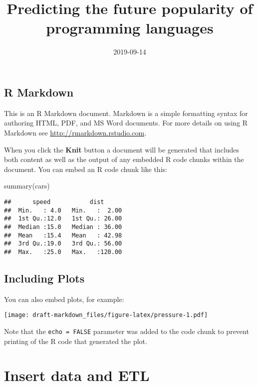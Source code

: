 \documentclass[
]{article}
\title{Predicting the future popularity of programming languages}
\author{}
\date{\vspace{-2.5em}2019-09-14}
\newenvironment{Shaded}{\begin{snugshade}}{\end{snugshade}}
\newcommand{\FunctionTok}[1]{\textcolor[rgb]{0.00,0.00,0.00}{#1}}
\newcommand{\NormalTok}[1]{#1}
\begin{document}
\maketitle

\hypertarget{r-markdown}{%
\subsection{R Markdown}\label{r-markdown}}

This is an R Markdown document. Markdown is a simple formatting syntax
for authoring HTML, PDF, and MS Word documents. For more details on
using R Markdown see \url{http://rmarkdown.rstudio.com}.

When you click the \textbf{Knit} button a document will be generated
that includes both content as well as the output of any embedded R code
chunks within the document. You can embed an R code chunk like this:

\begin{Shaded}
\begin{Highlighting}[]
\FunctionTok{summary}\NormalTok{(cars)}
\end{Highlighting}
\end{Shaded}

\begin{verbatim}
##      speed           dist       
##  Min.   : 4.0   Min.   :  2.00  
##  1st Qu.:12.0   1st Qu.: 26.00  
##  Median :15.0   Median : 36.00  
##  Mean   :15.4   Mean   : 42.98  
##  3rd Qu.:19.0   3rd Qu.: 56.00  
##  Max.   :25.0   Max.   :120.00
\end{verbatim}

\hypertarget{including-plots}{%
\subsection{Including Plots}\label{including-plots}}

You can also embed plots, for example:

\texttt{[image: draft-markdown\_files/figure-latex/pressure-1.pdf]}

Note that the \texttt{echo\ =\ FALSE} parameter was added to the code
chunk to prevent printing of the R code that generated the plot.

\hypertarget{insert-data-and-etl}{%
\section{Insert data and ETL}\label{insert-data-and-etl}}
\end{document}
